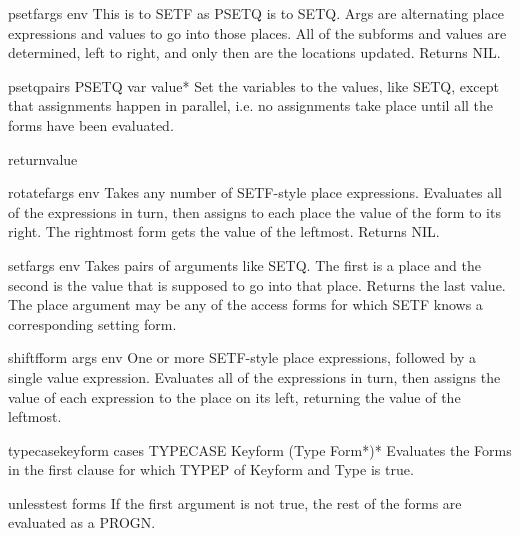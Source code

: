 \documentclass[10pt,english]{book}
\begin{document}
\begin{macro}{psetf}{\rest args \env env}
  This is to SETF as PSETQ is to SETQ. Args are alternating place
  expressions and values to go into those places. All of the subforms and
  values are determined, left to right, and only then are the locations
  updated. Returns NIL.
\end{macro}

\begin{macro}{psetq}{\rest pairs}
  PSETQ {var value}*
   Set the variables to the values, like SETQ, except that assignments
   happen in parallel, i.e. no assignments take place until all the
   forms have been evaluated.
\end{macro}

\begin{macro}{return}{\op value}
  
\end{macro}

\begin{macro}{rotatef}{\rest args \env env}
  Takes any number of SETF-style place expressions. Evaluates all of the
   expressions in turn, then assigns to each place the value of the form to
   its right. The rightmost form gets the value of the leftmost.
   Returns NIL.
\end{macro}

\begin{macro}{setf}{\rest args \env env}
  Takes pairs of arguments like SETQ. The first is a place and the second
  is the value that is supposed to go into that place. Returns the last
  value. The place argument may be any of the access forms for which SETF
  knows a corresponding setting form.
\end{macro}

\begin{macro}{shiftf}{\whole form \rest args \env env}
  One or more SETF-style place expressions, followed by a single
   value expression. Evaluates all of the expressions in turn, then
   assigns the value of each expression to the place on its left,
   returning the value of the leftmost.
\end{macro}

\begin{macro}{typecase}{keyform \body cases}
  TYPECASE Keyform {(Type Form*)}*
  Evaluates the Forms in the first clause for which TYPEP of Keyform and Type
  is true.
\end{macro}

\begin{macro}{unless}{test \body forms}
  If the first argument is not true, the rest of the forms are
evaluated as a PROGN.
\end{macro}
\end{document}
